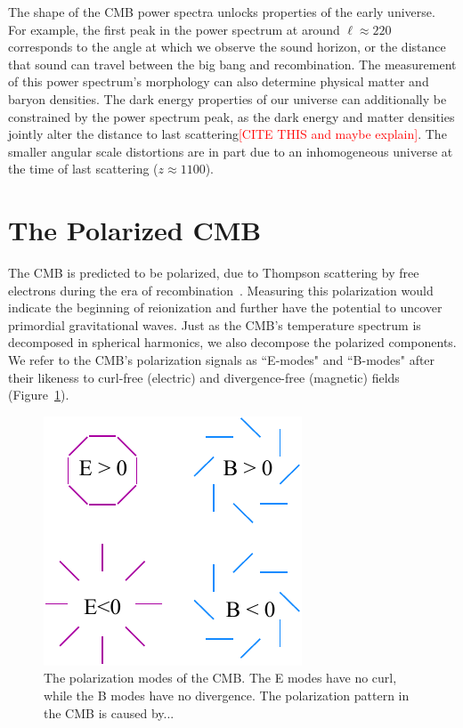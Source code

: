 The shape of the CMB power spectra unlocks properties of the early universe.  For example, the first peak in the power spectrum at around $\ell\approx220$ corresponds to the angle at which we observe the sound horizon, or the distance that sound can travel between the big bang and recombination.  The measurement of this power spectrum's morphology can also determine physical matter and baryon densities.  The dark energy properties of our universe can additionally be constrained by the power spectrum peak, as the dark energy and matter densities jointly alter the distance to last scattering\textcolor{red}{[CITE THIS and maybe explain]}.  The smaller angular scale distortions are in part due to an inhomogeneous universe at the time of last scattering ($z\approx 1100$).  

\section{The Polarized CMB}

The CMB is predicted to be polarized, due to Thompson scattering by free electrons during the era of recombination~\cite{weinberg_cosmo,Page_2007}.  Measuring this polarization would indicate the beginning of reionization and further have the potential to uncover primordial gravitational waves.  Just as the CMB's temperature spectrum is decomposed in spherical harmonics, we also decompose the polarized components.  We refer to the CMB's polarization signals as ``E-modes" and ``B-modes" after their likeness to curl-free (electric) and divergence-free (magnetic) fields (Figure~\ref{fig:e_b_pol}).
\begin{figure}
    \centering
    \includegraphics[width = .45\textwidth]{Figures/EB_pol.pdf}
    \caption{The polarization modes of the CMB.  The E modes have no curl, while the B modes have no divergence.  The polarization pattern in the CMB is caused by...}
    \label{fig:e_b_pol}
\end{figure}

